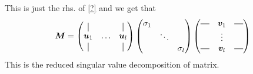 This is just the rhs. of \eqref{?} and we get that 
\begin{align}
    \bm{M} = \begin{pmatrix}
    \vertbar &        & \vertbar \\
    \bm{u}_1 & \hdots & \bm{u}_l \\
    \vertbar &        & \vertbar 
    \end{pmatrix}
    \begin{pmatrix}
        \sigma_1 &        &          \\
                 & \ddots &          \\ 
                 &        & \sigma_l
        \end{pmatrix}
    \begin{pmatrix}
        \horzbar & \bm{v}_1 & \horzbar \\
                  & \vdots   &  \\
        \horzbar & \bm{v}_l &  \horzbar \\
    \end{pmatrix} 
\end{align}
This is the reduced singular value decomposition of matrix. 

